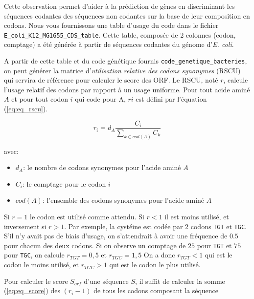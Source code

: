 \documentclass[10pt]{article}
\begin{document}
Cette observation permet d'aider à la prédiction de gènes en discriminant les séquences codantes des séquences non codantes sur la base de leur composition en codons.
Nous vous fournissons une table d'usage du code dans le fichier {\tt E\_coli\_K12\_MG1655\_CDS\_table}. Cette table, composée de 2 colonnes (codon, comptage) a été générée à partir de séquences codantes du génome d'{\em E. coli}.

A partir de cette table et du code génétique fournis {\tt code\_genetique\_bacteries}, on peut générer la matrice d'{\em utilisation relative des codons synonymes} (RSCU) qui servira de référence pour calculer le score des ORF. Le RSCU, noté $r$, calcule l’usage relatif des codons par rapport à un usage uniforme. Pour tout acide aminé $A$ et pour tout codon $i$ qui code pour A, $ri$  est défini par l'équation (\ref{eq:eq_rscu}).

\begin{equation} \label{eq:eq_rscu}
    r_{i}=d_{A}\frac{C_{i}}{\sum_{k \in cod(A)} C_{k}}
\end{equation}

avec:
\begin{itemize}
\item $d_{A}$: le nombre de codons synonymes pour l’acide aminé $A$
\item $C_{i}$: le comptage pour le codon $i$
\item $cod(A)$: l’ensemble des codons synonymes pour l’acide aminé $A$
\end{itemize}

Si $r = 1$ le codon est utilisé comme attendu. Si $r < 1$ il est moins utilisé, et inversement si $r > 1$. 
Par exemple, la cystéine est codée par 2 codons {\tt TGT} et {\tt TGC}. 
S'il n’y avait pas de biais d’usage, on s’attendrait à avoir une fréquence de $0.5$ pour chacun des deux codons. 
Si on observe un comptage de $25$ pour {\tt TGT} et $75$ pour {\tt TGC}, on calcule $r_{TGT}= 0,5$ et  $r_{TGC}= 1,5$
On a donc  $r_{TGT}<1$ qui est le codon le moins utilisé, et  $r_{TGC}>1$ qui est le codon le plus utilisé.


Pour calculer le score $S_{orf}$ d'une séquence $S$, il suffit de calculer la somme (\ref{eq:eq_score}) des $(r_{i} - 1)$ de tous les codons  composant la séquence 
\end{document}
